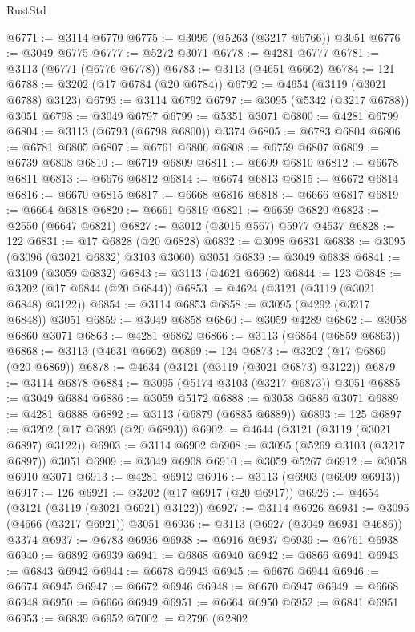 \begin{lexlean}{RustStd}
\begin{coremodule}
@6771 := @3114 @6770
@6775 := @3095 (@5263 (@3217 @6766)) @3051
@6776 := @3049 @6775
@6777 := @5272 @3071
@6778 := @4281 @6777
@6781 := @3113 (@6771 (@6776 @6778))
@6783 := @3113 (@4651 @6662)
@6784 := 121
@6788 := @3202 (@17 @6784 (@20 @6784))
@6792 := @4654 (@3119 (@3021 @6788) @3123)
@6793 := @3114 @6792
@6797 := @3095 (@5342 (@3217 @6788)) @3051
@6798 := @3049 @6797
@6799 := @5351 @3071
@6800 := @4281 @6799
@6804 := @3113 (@6793 (@6798 @6800)) @3374
@6805 := @6783 @6804
@6806 := @6781 @6805
@6807 := @6761 @6806
@6808 := @6759 @6807
@6809 := @6739 @6808
@6810 := @6719 @6809
@6811 := @6699 @6810
@6812 := @6678 @6811
@6813 := @6676 @6812
@6814 := @6674 @6813
@6815 := @6672 @6814
@6816 := @6670 @6815
@6817 := @6668 @6816
@6818 := @6666 @6817
@6819 := @6664 @6818
@6820 := @6661 @6819
@6821 := @6659 @6820
@6823 := @2550 (@6647 @6821)
@6827 := @3012 (@3015 @567) @5977 @4537
@6828 := 122
@6831 := @17 @6828 (@20 @6828)
@6832 := @3098 @6831
@6838 := @3095 (@3096 (@3021 @6832) @3103 @3060) @3051
@6839 := @3049 @6838
@6841 := @3109 (@3059 @6832)
@6843 := @3113 (@4621 @6662)
@6844 := 123
@6848 := @3202 (@17 @6844 (@20 @6844))
@6853 := @4624 (@3121 (@3119 (@3021 @6848) @3122))
@6854 := @3114 @6853
@6858 := @3095 (@4292 (@3217 @6848)) @3051
@6859 := @3049 @6858
@6860 := @3059 @4289
@6862 := @3058 @6860 @3071
@6863 := @4281 @6862
@6866 := @3113 (@6854 (@6859 @6863))
@6868 := @3113 (@4631 @6662)
@6869 := 124
@6873 := @3202 (@17 @6869 (@20 @6869))
@6878 := @4634 (@3121 (@3119 (@3021 @6873) @3122))
@6879 := @3114 @6878
@6884 := @3095 (@5174 @3103 (@3217 @6873)) @3051
@6885 := @3049 @6884
@6886 := @3059 @5172
@6888 := @3058 @6886 @3071
@6889 := @4281 @6888
@6892 := @3113 (@6879 (@6885 @6889))
@6893 := 125
@6897 := @3202 (@17 @6893 (@20 @6893))
@6902 := @4644 (@3121 (@3119 (@3021 @6897) @3122))
@6903 := @3114 @6902
@6908 := @3095 (@5269 @3103 (@3217 @6897)) @3051
@6909 := @3049 @6908
@6910 := @3059 @5267
@6912 := @3058 @6910 @3071
@6913 := @4281 @6912
@6916 := @3113 (@6903 (@6909 @6913))
@6917 := 126
@6921 := @3202 (@17 @6917 (@20 @6917))
@6926 := @4654 (@3121 (@3119 (@3021 @6921) @3122))
@6927 := @3114 @6926
@6931 := @3095 (@4666 (@3217 @6921)) @3051
@6936 := @3113 (@6927 (@3049 @6931 @4686)) @3374
@6937 := @6783 @6936
@6938 := @6916 @6937
@6939 := @6761 @6938
@6940 := @6892 @6939
@6941 := @6868 @6940
@6942 := @6866 @6941
@6943 := @6843 @6942
@6944 := @6678 @6943
@6945 := @6676 @6944
@6946 := @6674 @6945
@6947 := @6672 @6946
@6948 := @6670 @6947
@6949 := @6668 @6948
@6950 := @6666 @6949
@6951 := @6664 @6950
@6952 := @6841 @6951
@6953 := @6839 @6952
@7002 := @2796
    (@2802

\end{coremodule}
\end{lexlean}
